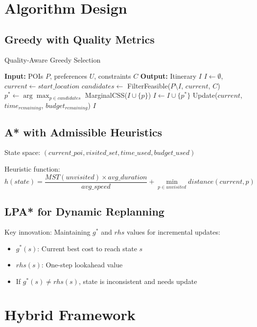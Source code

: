 \section{Algorithm Design}

\subsection{Greedy with Quality Metrics}
\begin{algorithm}
\caption{Quality-Aware Greedy Selection}
\begin{algorithmic}
\STATE \textbf{Input:} POIs $P$, preferences $U$, constraints $C$
\STATE \textbf{Output:} Itinerary $I$
\STATE $I \leftarrow \emptyset$, $current \leftarrow start\_location$
    \STATE $candidates \leftarrow$ FilterFeasible($P \setminus I$, $current$, $C$)
    \STATE $p^* \leftarrow \arg\max_{p \in candidates}$ MarginalCSS($I \cup \{p\}$)
    \STATE $I \leftarrow I \cup \{p^*\}$
    \STATE Update($current$, $time_{remaining}$, $budget_{remaining}$)
\ENDWHILE
\RETURN $I$
\end{algorithmic}
\end{algorithm}

\subsection{A* with Admissible Heuristics}
State space: $(current\_poi, visited\_set, time\_used, budget\_used)$

Heuristic function:
$$h(state) = \frac{MST(unvisited) \times avg\_duration}{avg\_speed} + \min_{p \in unvisited} distance(current, p)$$

\subsection{LPA* for Dynamic Replanning}
Key innovation: Maintaining $g^*$ and $rhs$ values for incremental updates:
\begin{itemize}
    \item $g^*(s)$: Current best cost to reach state $s$
    \item $rhs(s)$: One-step lookahead value
    \item If $g^*(s) \neq rhs(s)$, state is inconsistent and needs update
\end{itemize}

\section{Hybrid Framework}

